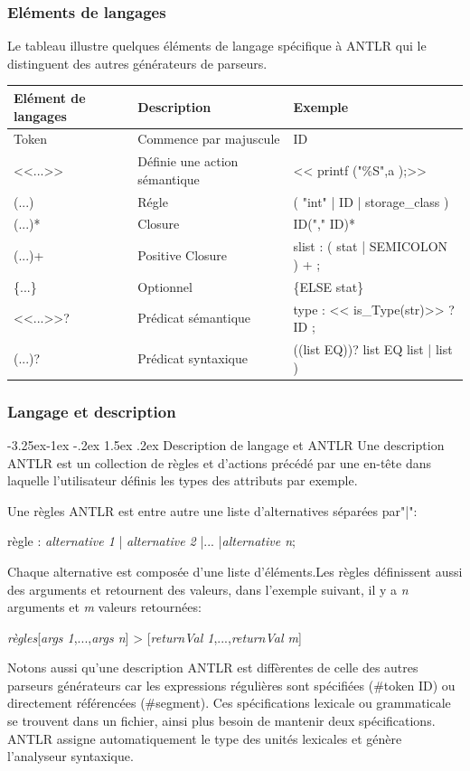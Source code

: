 \documentclass{article}
\makeatletter
\newcounter {subsubsubsection}[subsubsection]
\newcommand\subsubsubsection{\@startsection{subsubsubsection}{4}{\z@}%
                                     {-3.25ex\@plus -1ex \@minus -.2ex}%
                                     {1.5ex \@plus .2ex}%
                                     {\normalfont\normalsize\bfseries}}
\makeatother
\begin{document}
\subsubsection{Eléments de langages}
Le tableau illustre quelques éléments de langage spécifique à ANTLR qui le distinguent des autres générateurs de parseurs.
\newline

\begin{tabular}{|l|l|l|}
\hline
Elément de langages & Description & Exemple \\
\hline
Token & Commence par majuscule & ID \\
\hline
<<...>> & Définie une action sémantique & << printf ("\%S",a );>> \\
\hline	
(...) & Régle & ( "int" | ID  | storage\_class ) \\
\hline
(...)* & Closure & ID("," ID)* \\
\hline
(...)+ & Positive Closure & slist : ( stat | SEMICOLON ) + ; \\
\hline
\{...\} & Optionnel & \{ELSE stat\} \\
\hline
<<...>>? & Prédicat sémantique & type : << is\_Type(str)>> ? ID ; \\
\hline
(...)? & Prédicat syntaxique & ((list EQ))? list EQ list | list ) \\
\hline
\end{tabular}
\subsubsection{Langage et description}
\subsubsubsection{Description de langage et ANTLR}
Une description ANTLR est un collection de règles et d'actions précédé par une en-tête dans laquelle l'utilisateur définis les types des attributs par exemple.

Une règles ANTLR est entre autre une liste d'alternatives séparées par"|":


règle : \textit{alternative \textsl{1}} | \textit{alternative \textsl{2}} |... |\textit{alternative \textsl{n}};


Chaque alternative est composée d'une liste d'éléments.Les règles définissent aussi des arguments et retournent des valeurs, dans l'exemple suivant, il y a \textsl{n} arguments et \textsl{m} valeurs retournées:


\textit{règles}[\textit{args \textsl{1}},...,\textit{args \textsl{n}}] > [\textit{returnVal \textsl{1}},...,\textit{returnVal \textsl{m}}]


Notons aussi qu'une description ANTLR est diffèrentes de celle des autres parseurs générateurs car les expressions régulières sont spécifiées (\#token ID) ou directement référencées (\#segment). Ces spécifications lexicale ou grammaticale se trouvent dans un fichier, ainsi plus besoin de mantenir deux spécifications. ANTLR assigne automatiquement le type des unités lexicales et génère l'analyseur syntaxique.
\end{document}
